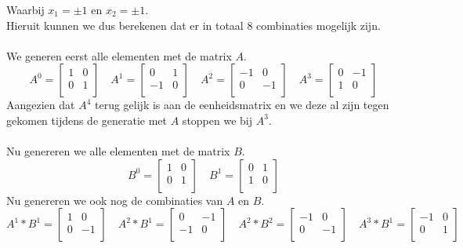 \documentclass[11pt,a4paper,titlepage]{article}
\begin{document}
Waarbij $x_1 = \pm 1$ en $x_2 = \pm 1$.\\
Hieruit kunnen we dus berekenen dat er in totaal 8 combinaties mogelijk zijn.\\ \\
We generen eerst alle elementen met de matrix $A$.
\[
A^0 =
\begin{bmatrix}
    	1 & 0 \\
	0 & 1 \\
\end{bmatrix}
\quad
A^1 =
\begin{bmatrix}
    	0 & 1 \\
	-1 & 0 \\
\end{bmatrix}
\quad
A^2 =
\begin{bmatrix}
    	-1 & 0 \\
	0 & -1 \\
\end{bmatrix}
\quad
A^3 =
\begin{bmatrix}
    	0 & -1 \\
	1 & 0 \\
\end{bmatrix}
\]
Aangezien dat $A^4$ terug gelijk is aan de eenheidsmatrix en we deze al zijn tegen gekomen tijdens de generatie met $A$ stoppen we bij $A^3$.\\ \\
Nu genereren we alle elementen met de matrix $B$.
\[
B^0 =
\begin{bmatrix}
    	1 & 0 \\
	0 & 1 \\
\end{bmatrix}
\quad
B^1 =
\begin{bmatrix}
    	0 & 1 \\
	1 & 0 \\
\end{bmatrix}
\]
Nu genereren we ook nog de combinaties van $A$ en $B$.
\[
A^1 * B^1 =
\begin{bmatrix}
    	1 & 0 \\
	0 & -1 \\
\end{bmatrix}
\quad
A^2 * B^1 =
\begin{bmatrix}
    	0 & -1 \\
	-1 & 0 \\
\end{bmatrix}
\quad
A^2 * B^2 =
\begin{bmatrix}
    	-1 & 0 \\
	0 & -1 \\
\end{bmatrix}
\quad
A^3 * B^1 =
\begin{bmatrix}
    	-1 & 0 \\
	0 & 1 \\
\end{bmatrix}
\]
\end{document}
